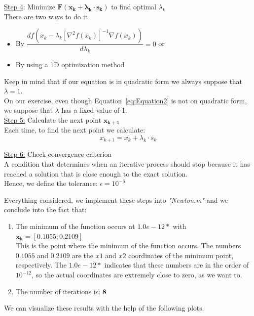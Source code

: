 \underline{Step 4}: Minimize $\mathbf{F(x_{k} + \lambda_{k} \cdot s_{k})}$ to find optimal $\lambda_{k}$\\
There are two ways to do it
\begin{itemize}
	\item By $\dfrac{d f(x_k - \lambda_k [\nabla^2 f(x_k)]^{-1} \nabla f(x_k))}{d \lambda_k} = 0$ or
	\item By using a 1D optimization method
\end{itemize}
Keep in mind that if our equation is in quadratic form we always suppose that $\lambda = 1$.\\
On our exercise, even though Equation~\ref{eq:Equation2} is not on quadratic form, we suppose that $\lambda$ has a fixed value of 1.\\

\underline{Step 5:} Calculate the next point $\mathbf{x_{k+1}}$\\
Each time, to find the next point we calculate:
\begin{equation}
	x_{k+1} = x_{k} + \lambda_{k} \cdot s_{k}
\end{equation}

\underline{Step 6:} Check convergence criterion\\
A condition that determines when an iterative process should stop because it has reached a solution that is close enough to the exact solution. \\
Hence, we define the tolerance: $\epsilon = 10^{-6}$
\vspace{2mm}

Everything considered, we implement these steps into \textit{"Newton.m"} and we conclude into the fact that:\\
\begin{enumerate}
	\item The minimum of the function occurs at $1.0e-12*$ with $\mathbf{x_{k} = [0.1055; 0.2109]}$\\
	This is the point where the minimum of the function occurs. The numbers $0.1055$ and $0.2109$ are the $x1$ and $x2$ coordinates of the minimum point, respectively. The $1.0e-12*$ indicates that these numbers are in the order of $10^{-12}$, so the actual coordinates are extremely close to zero, as we want to.
	\item The number of iterations is: $\mathbf{8}$
\end{enumerate}

We can visualize these results with the help of the following plots.

